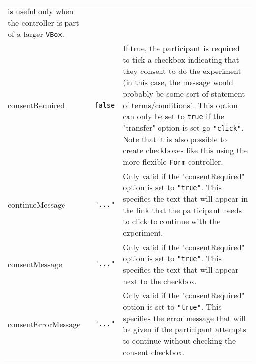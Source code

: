 \documentclass[
]{article}
\begin{document}
\begin{RaggedRight}
\begin{longtable}[]{p{1.7in}p{1in}p{3.15in}}
\begin{minipage}[t]{0.59\columnwidth}
is useful only when the controller is part of a larger
\texttt{VBox}.\strut
\end{minipage}\tabularnewline
\begin{minipage}[t]{0.19\columnwidth}\raggedright
consentRequired\strut
\end{minipage} & \begin{minipage}[t]{0.13\columnwidth}\raggedright
\texttt{false}\strut
\end{minipage} & \begin{minipage}[t]{0.59\columnwidth}\raggedright
If true, the participant is required to tick a checkbox indicating that
they consent to do the experiment (in this case, the message would
probably be some sort of statement of terms/conditions). This option can
only be set to \texttt{true} if the "transfer" option is set go
\texttt{"click"}. Note that it is also possible to create checkboxes
like this using the more flexible \texttt{Form} controller.\strut
\end{minipage}\tabularnewline
\begin{minipage}[t]{0.19\columnwidth}\raggedright
continueMessage\strut
\end{minipage} & \begin{minipage}[t]{0.13\columnwidth}\raggedright
\texttt{"..."}\strut
\end{minipage} & \begin{minipage}[t]{0.59\columnwidth}\raggedright
Only valid if the "consentRequired" option is set to \texttt{"true"}.
This specifies the text that will appear in the link that the
participant needs to click to continue with the experiment.\strut
\end{minipage}\tabularnewline
\begin{minipage}[t]{0.19\columnwidth}\raggedright
consentMessage\strut
\end{minipage} & \begin{minipage}[t]{0.13\columnwidth}\raggedright
\texttt{"..."}\strut
\end{minipage} & \begin{minipage}[t]{0.59\columnwidth}\raggedright
Only valid if the "consentRequired" option is set to \texttt{"true"}.
This specifies the text that will appear next to the checkbox.\strut
\end{minipage}\tabularnewline
\begin{minipage}[t]{0.19\columnwidth}\raggedright
consentErrorMessage\strut
\end{minipage} & \begin{minipage}[t]{0.13\columnwidth}\raggedright
\texttt{"..."}\strut
\end{minipage} & \begin{minipage}[t]{0.59\columnwidth}\raggedright
Only valid if the "consentRequired" option is set to \texttt{"true"}.
This specifies the error message that will be given if the participant
attempts to continue without checking the consent checkbox.\strut
\end{minipage}\tabularnewline
\bottomrule
\end{longtable}\normalsize\end{RaggedRight}
\end{document}
